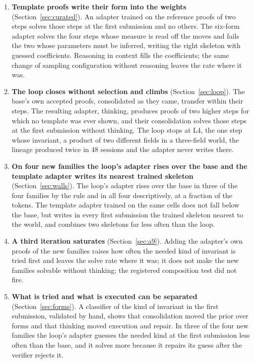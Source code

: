 \documentclass[11pt]{article}
\begin{document}
\begin{enumerate}
\item \textbf{Template proofs write their form into the weights}
(Section~\ref{sec:curated}). An adapter trained on the reference proofs of
two steps solves those steps at the first submission and no others. The
six-form adapter solves the four steps whose measure is read off the moves
and fails the two whose parameters must be inferred, writing the right
skeleton with guessed coefficients. Reasoning in context fills the coefficients; the same change of sampling configuration without reasoning leaves the rate where it was.
\item \textbf{The loop closes without selection and climbs}
(Section~\ref{sec:loop}). The base's own accepted proofs, consolidated as
they came, transfer within their steps. The resulting adapter, thinking,
produces proofs of two higher steps for which no template was ever shown,
and their consolidation solves those steps at the first submission
without thinking. The loop stops at L4, the one step whose invariant, a
product of two different fields in a three-field world, the lineage
produced twice in 48 sessions and the adapter never writes there.
\item \textbf{On four new families the loop's adapter rises over the base
and the template adapter writes its nearest trained skeleton}
(Section~\ref{sec:walls}). The loop's adapter rises over the base in three
of the four families by the rule and in all four descriptively, at a
fraction of the tokens. The template adapter trained on the same cells
does not fall below the base, but writes in every first submission the
trained skeleton nearest to the world, and combines two skeletons far
less often than the loop.
\item \textbf{A third iteration saturates} (Section~\ref{sec:a9}). Adding
the adapter's own proofs of the new families raises how often the needed
kind of invariant is tried first and leaves the solve rate where it was;
it does not make the new families solvable without thinking; the
registered composition test did not fire.
\item \textbf{What is tried and what is executed can be separated}
(Section~\ref{sec:forms}). A classifier of the kind of invariant in the
first submission, validated by hand, shows that consolidation moved the
prior over forms and that thinking moved execution and repair. In three
of the four new families the loop's adapter guesses the needed kind at the
first submission less often than the base, and it solves more because it
repairs its guess after the verifier rejects it.
\end{enumerate}
\end{document}
